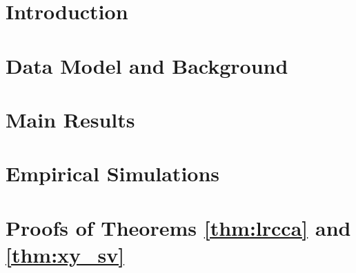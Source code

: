 \section{Introduction}\label{sec:chpt6:intro}


\section{Data Model and Background}\label{sec:chpt6:data_model}


\section{Main Results}\label{sec:chpt6:main_results}


\section{Empirical Simulations}\label{sec:chpt6:emp_results}


\section{Proofs of Theorems \ref{thm:lrcca} and \ref{thm:xy_sv}}\label{sec:chpt6:proofs}


%
